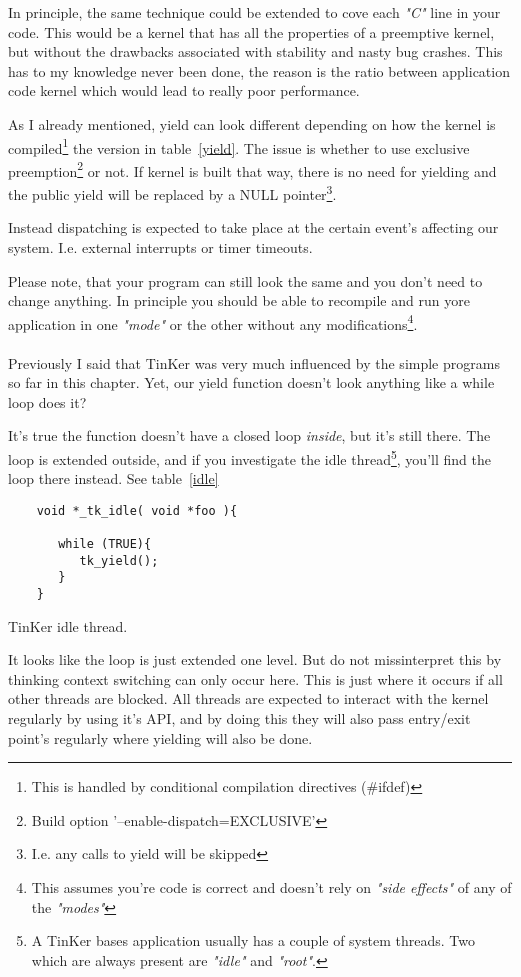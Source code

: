 	In principle, the same technique could be extended to cove each \textit{"C"} line in your code. This would be a kernel that has all the properties of a preemptive kernel, but without the drawbacks associated with stability and nasty bug crashes. This has to my knowledge never been done, the reason is the ratio between application code kernel which would lead to really poor performance.

	As I already mentioned, yield can look different depending on how the kernel is compiled\footnote{This is handled by conditional compilation directives (\#ifdef)}  the version in table~\ref{yield}. The issue is whether to use exclusive preemption\footnote{Build option '--enable-dispatch=EXCLUSIVE'} or not. If kernel is built that way, there is no need for yielding and the public yield will be replaced by a NULL pointer\footnote{I.e. any calls to yield will be skipped}.

	Instead dispatching is expected to take place at the certain event's affecting our system. I.e. external interrupts or timer timeouts. 

	Please note, that your program can still look the same and you don't need to change anything. In principle you should be able to recompile and run yore application in one \textit{"mode"} or the other without any modifications\footnote{This assumes you're code is correct and doesn't rely on \textit{"side effects"} of any of the \textit{"modes"}}.
\\\\
	Previously I said that TinKer was very much influenced by the simple programs so far in this chapter. Yet, our yield function doesn't look anything like a while loop does it? 

	It's true the function doesn't have a closed loop \textit{inside}, but it's still there. The loop is extended outside, and if you investigate the idle thread\footnote{A TinKer bases application usually has a couple of system threads. Two which are always present are \textit{"idle"} and \textit{"root"}.}, you'll find the loop there instead. See table~\ref{idle}
	\begin{table}[!hbp]
	\begin{verbatim}
	void *_tk_idle( void *foo ){
 
	   while (TRUE){
	      tk_yield();
	   }
	}
	\end{verbatim}
	\caption{TinKer idle thread.\label{idle}}
	\end{table}
	
	It looks like the loop is just extended one level. But do not missinterpret this by thinking context switching can only occur here. This is just where it occurs if all other threads are blocked. All threads are expected to interact with the kernel regularly by using it's API, and by doing this they will also pass entry/exit point's regularly where yielding will also be done.

